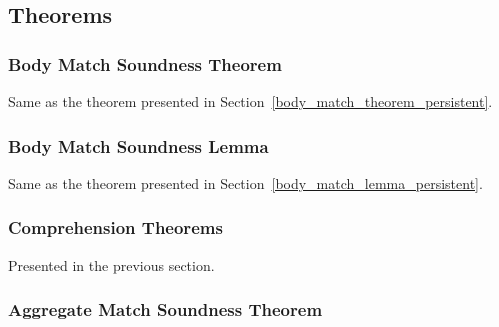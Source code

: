 \begin{definition}
\begin{enumerate}
\end{enumerate}

\end{definition}

\subsection{Theorems}

\subsubsection{Body Match Soundness Theorem}

Same as the theorem presented in Section~\ref{body_match_theorem_persistent}.

\subsubsection{Body Match Soundness Lemma}

Same as the theorem presented in Section~\ref{body_match_lemma_persistent}.

\subsubsection{Comprehension Theorems}

Presented in the previous section.

\subsubsection{Aggregate Match Soundness Theorem}

